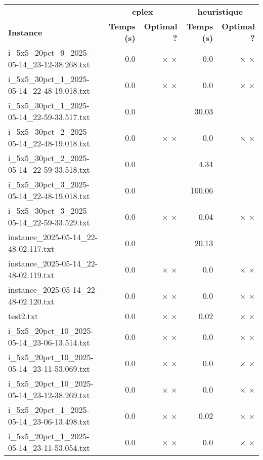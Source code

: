 \documentclass{article}
\begin{document}
\newpage
\begin{center}
\renewcommand{\arraystretch}{1.4} 
 \begin{tabular}{lrrrr}
	\hline
 & \multicolumn{2}{c}{\textbf{cplex}} & \multicolumn{2}{c}{\textbf{heuristique}}\\
\textbf{Instance}  & \textbf{Temps (s)} & \textbf{Optimal ?}  & \textbf{Temps (s)} & \textbf{Optimal ?} \\\hline

i\_5x5\_20pct\_9\_2025-05-14\_23-12-38.268.txt & 0.0 & 
$\times$
$\times$
 & 0.0 & 
$\times$
$\times$
\\
i\_5x5\_30pct\_1\_2025-05-14\_22-48-19.018.txt & 0.0 & 
$\times$
$\times$
 & 0.0 & 
$\times$
$\times$
\\
i\_5x5\_30pct\_1\_2025-05-14\_22-59-33.517.txt & 0.0 & 
 & 30.03 & 
\\
i\_5x5\_30pct\_2\_2025-05-14\_22-48-19.018.txt & 0.0 & 
$\times$
$\times$
 & 0.0 & 
$\times$
$\times$
\\
i\_5x5\_30pct\_2\_2025-05-14\_22-59-33.518.txt & 0.0 & 
 & 4.34 & 
\\
i\_5x5\_30pct\_3\_2025-05-14\_22-48-19.018.txt & 0.0 & 
 & 100.06 & 
\\
i\_5x5\_30pct\_3\_2025-05-14\_22-59-33.529.txt & 0.0 & 
$\times$
$\times$
 & 0.04 & 
$\times$
$\times$
\\
instance\_2025-05-14\_22-48-02.117.txt & 0.0 & 
 & 20.13 & 
\\
instance\_2025-05-14\_22-48-02.119.txt & 0.0 & 
$\times$
$\times$
 & 0.0 & 
$\times$
$\times$
\\
instance\_2025-05-14\_22-48-02.120.txt & 0.0 & 
$\times$
$\times$
 & 0.0 & 
$\times$
$\times$
\\
test2.txt & 0.0 & 
$\times$
$\times$
 & 0.02 & 
$\times$
$\times$
\\
i\_5x5\_20pct\_10\_2025-05-14\_23-06-13.514.txt & 0.0 & 
$\times$
$\times$
 & 0.0 & 
$\times$
$\times$
\\
i\_5x5\_20pct\_10\_2025-05-14\_23-11-53.069.txt & 0.0 & 
$\times$
$\times$
 & 0.0 & 
$\times$
$\times$
\\
i\_5x5\_20pct\_10\_2025-05-14\_23-12-38.269.txt & 0.0 & 
$\times$
$\times$
 & 0.0 & 
$\times$
$\times$
\\
i\_5x5\_20pct\_1\_2025-05-14\_23-06-13.498.txt & 0.0 & 
$\times$
$\times$
 & 0.02 & 
$\times$
$\times$
\\
i\_5x5\_20pct\_1\_2025-05-14\_23-11-53.054.txt & 0.0 & 
$\times$
$\times$
 & 0.0 & 
$\times$
$\times$
\\

\end{tabular}
\end{center}
\end{document}
